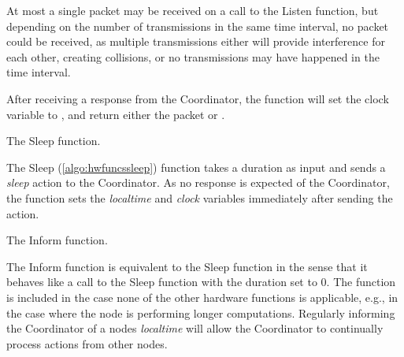 At most a single packet may be received on a call to the Listen function, but depending on the number
of transmissions in the same time interval, no packet could be received, as multiple transmissions either will
provide interference for each other, creating collisions, or no transmissions may have happened in the time
interval.

After receiving a response from the Coordinator, the function will set the clock variable to \KwNow, and
return either the packet or \KwNull. \medbreak

\begin{algorithm}[ht]
    \DontPrintSemicolon
    
    
    \caption{The Sleep function.}
    \label{algo:hwfuncssleep}
\end{algorithm}

The Sleep (\autoref{algo:hwfuncssleep}) function takes a duration as input and sends a \textit{sleep} action to the
Coordinator. As no response is expected of the Coordinator, the function sets the \textit{localtime} and
\textit{clock} variables immediately after sending the action. \medbreak

\begin{algorithm}[ht]
    \DontPrintSemicolon
    
    
    \caption{The Inform function.}
    \label{algo:hwfuncsupdatelocaltime}
\end{algorithm}

The Inform function is equivalent to the Sleep function in the sense that it behaves like a call to the Sleep
function with the duration set to 0. The function is included in the case none of the other hardware
functions is applicable, e.g., in the case where the node is performing longer computations. Regularly
informing the Coordinator of a nodes \textit{localtime} will allow the Coordinator to continually process actions from
other nodes.

